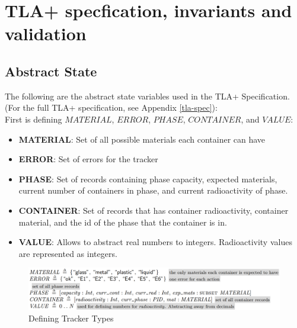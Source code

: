 \newpage
\section{TLA+ specfication, invariants and validation}


\subsection{Abstract State}

The following are the abstract state variables used in the TLA+ Specification. (For the full TLA+ specification, see Appendix \ref{tla-spec}): \\ 

First is defining $MATERIAL$, $ERROR$, $PHASE$, $CONTAINER$, and $VALUE$:

 \begin{itemize}
\item \textbf{MATERIAL}: Set of all possible materials each container can have
\item \textbf{ERROR}: Set of errors for the tracker
\item \textbf{PHASE}: Set of records containing phase capacity, expected materials, current number of containers in phase, and current radioactivity of phase.
\item \textbf{CONTAINER}: Set of records that has container radioactivity, container material, and the id of the phase that the container is in.
\item \textbf{VALUE}: Allows to abstract real numbers to integers. Radioactivity values are represented as integers. 
\end{itemize}

\begin{figure}[!htb]
\begin{center}
\includegraphics[width=.99\textwidth]{images/tla_defs.png}
\end{center}
\caption{Defining Tracker Types}
\label{fig:defining_tracker}
\end{figure}

